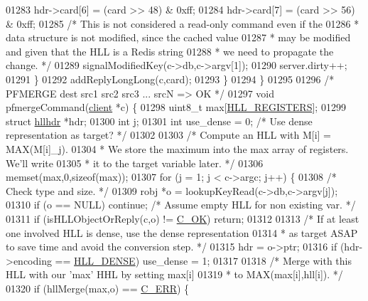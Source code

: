\begin{DoxyCode}
{{01283             hdr->card[6] = (card >> 48) & 0xff;
01284             hdr->card[7] = (card >> 56) & 0xff;
01285             \textcolor{comment}{/* This is not considered a read-only command even if the}
01286 \textcolor{comment}{             * data structure is not modified, since the cached value}
01287 \textcolor{comment}{             * may be modified and given that the HLL is a Redis string}
01288 \textcolor{comment}{             * we need to propagate the change. */}
01289             signalModifiedKey(c->db,c->argv[1]);
01290             server.dirty++;
01291         \}
01292         addReplyLongLong(c,card);
01293     \}
01294 \}
01295 
01296 \textcolor{comment}{/* PFMERGE dest src1 src2 src3 ... srcN => OK */}
01297 \textcolor{keywordtype}{void} pfmergeCommand(\hyperlink{structclient}{client} *c) \{
01298     uint8\_t max[\hyperlink{hyperloglog_8c_aa053beb90136828dcb46545c7445fc36}{HLL\_REGISTERS}];
01299     \textcolor{keyword}{struct} \hyperlink{structhllhdr}{hllhdr} *hdr;
01300     \textcolor{keywordtype}{int} j;
01301     \textcolor{keywordtype}{int} use\_dense = 0; \textcolor{comment}{/* Use dense representation as target? */}
01302 
01303     \textcolor{comment}{/* Compute an HLL with M[i] = MAX(M[i]\_j).}
01304 \textcolor{comment}{     * We store the maximum into the max array of registers. We'll write}
01305 \textcolor{comment}{     * it to the target variable later. */}
01306     memset(max,0,\textcolor{keyword}{sizeof}(max));
01307     \textcolor{keywordflow}{for} (j = 1; j < c->argc; j++) \{
01308         \textcolor{comment}{/* Check type and size. */}
01309         robj *o = lookupKeyRead(c->db,c->argv[j]);
01310         \textcolor{keywordflow}{if} (o == NULL) \textcolor{keywordflow}{continue}; \textcolor{comment}{/* Assume empty HLL for non existing var. */}
01311         \textcolor{keywordflow}{if} (isHLLObjectOrReply(c,o) != \hyperlink{server_8h_a303769ef1065076e68731584e758d3e1}{C\_OK}) \textcolor{keywordflow}{return};
01312 
01313         \textcolor{comment}{/* If at least one involved HLL is dense, use the dense representation}
01314 \textcolor{comment}{         * as target ASAP to save time and avoid the conversion step. */}
01315         hdr = o->ptr;
01316         \textcolor{keywordflow}{if} (hdr->encoding == \hyperlink{hyperloglog_8c_a5f2ead2492fc9cc4ff39f8c1752875a1}{HLL\_DENSE}) use\_dense = 1;
01317 
01318         \textcolor{comment}{/* Merge with this HLL with our 'max' HHL by setting max[i]}
01319 \textcolor{comment}{         * to MAX(max[i],hll[i]). */}
01320         \textcolor{keywordflow}{if} (hllMerge(max,o) == \hyperlink{server_8h_af98ac28d5f4d23d7ed5985188e6fb7d1}{C\_ERR}) \{
}}
\end{DoxyCode}
